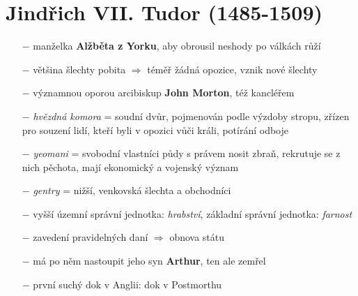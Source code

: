 \documentclass{article}
\begin{document}
\section*{Jindřich VII. Tudor (1485-1509)}
\begin{itemize}
    \vspace{-0.5em}
    \setlength\itemsep{0.15em}
    \item[$-$] manželka \textbf{Alžběta z Yorku}, aby obrousil neshody po válkách růží
    \item[$-$] většina šlechty pobita $\Rightarrow$ téměř žádná opozice, vznik nové šlechty
    \item[$-$] významnou oporou arcibiskup \textbf{John Morton}, též kancléřem
    \item[$-$] \textit{hvězdná komora} = soudní dvůr, pojmenován podle výzdoby stropu, zřízen pro souzení lidí, kteří byli v opozici vůči králi, potírání odboje
    \item[$-$]  \textit{yeomani} = svobodní vlastníci půdy s právem nosit zbraň, rekrutuje se z nich pěchota, mají ekonomický a vojenský význam
    \item[$-$] \textit{gentry} = nižší, venkovská šlechta a obchodníci
    \item[$-$] vyšší územní správní jednotka: \textit{hrabství}, základní správní jednotka: \textit{farnost}
    \item[$-$] zavedení pravidelných daní $\Rightarrow$ obnova státu
    \item[$-$] má po něm nastoupit jeho syn \textbf{Arthur}, ten ale zemřel
    \item[$-$] první suchý dok v Anglii: dok v Postmorthu
\end{itemize}
\end{document}
